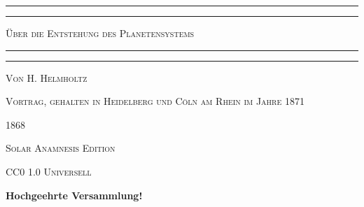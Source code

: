 \documentclass[a4paper, 11pt, oneside, german]{article}
\begin{document}
\begin{titlepage} %
	\centering %

	
	\rule{\textwidth}{1.6pt}\vspace*{-\baselineskip}\vspace*{2pt} %
	\rule{\textwidth}{0.4pt} %
	
	\vspace{1\baselineskip} %
	
	{\scshape\LARGE Über die Entstehung des Planetensystems\\[1.25pt]}
	
	\vspace{1\baselineskip} %

	\rule{\textwidth}{0.4pt}\vspace*{-\baselineskip}\vspace{3.2pt} %
	\rule{\textwidth}{1.6pt} %
	
	\vspace{1\baselineskip} %
	
	
	{\scshape\small Von \large H. Helmholtz} %
	
	\vspace*{1\baselineskip} %
	
    {\scshape\small Vortrag, gehalten in Heidelberg und Cöln am Rhein im Jahre 1871} %
    	
    \vspace*{\fill}

	\vspace{1\baselineskip}

	{\small\scshape 1868}
		
	\vspace{0.5\baselineskip} %

    {\scshape Solar Anamnesis Edition}  %
	
	{\scshape\small CC0 1.0 Universell} %
\end{titlepage}
\setlength{\parskip}{1mm plus1mm minus1mm}
\clearpage
\begin{center}
\textbf{Hochgeehrte Versammlung!}
\end{center}
\end{document}
